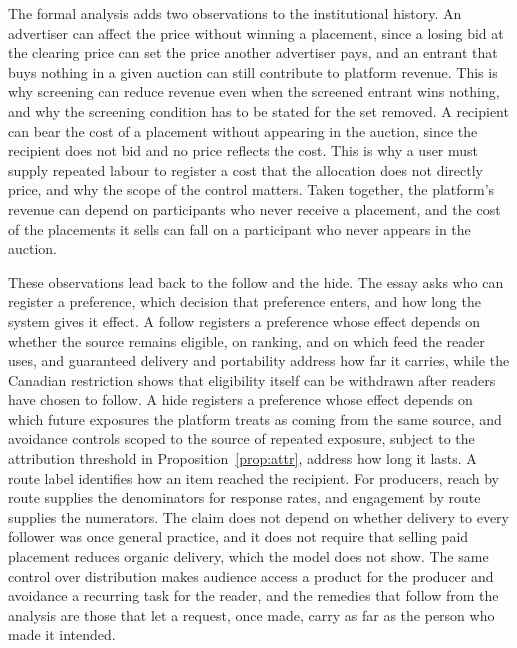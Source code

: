 \documentclass[11pt]{article}
\theoremstyle{definition}
\begin{document}
The formal analysis adds two observations to the institutional history. An advertiser can affect the price without winning a placement, since a losing bid at the clearing price can set the price another advertiser pays, and an entrant that buys nothing in a given auction can still contribute to platform revenue. This is why screening can reduce revenue even when the screened entrant wins nothing, and why the screening condition has to be stated for the set removed. A recipient can bear the cost of a placement without appearing in the auction, since the recipient does not bid and no price reflects the cost. This is why a user must supply repeated labour to register a cost that the allocation does not directly price, and why the scope of the control matters. Taken together, the platform's revenue can depend on participants who never receive a placement, and the cost of the placements it sells can fall on a participant who never appears in the auction.

These observations lead back to the follow and the hide. The essay asks who can register a preference, which decision that preference enters, and how long the system gives it effect. A follow registers a preference whose effect depends on whether the source remains eligible, on ranking, and on which feed the reader uses, and guaranteed delivery and portability address how far it carries, while the Canadian restriction shows that eligibility itself can be withdrawn after readers have chosen to follow. A hide registers a preference whose effect depends on which future exposures the platform treats as coming from the same source, and avoidance controls scoped to the source of repeated exposure, subject to the attribution threshold in Proposition~\ref{prop:attr}, address how long it lasts. A route label identifies how an item reached the recipient. For producers, reach by route supplies the denominators for response rates, and engagement by route supplies the numerators. The claim does not depend on whether delivery to every follower was once general practice, and it does not require that selling paid placement reduces organic delivery, which the model does not show. The same control over distribution makes audience access a product for the producer and avoidance a recurring task for the reader, and the remedies that follow from the analysis are those that let a request, once made, carry as far as the person who made it intended.
\end{document}
